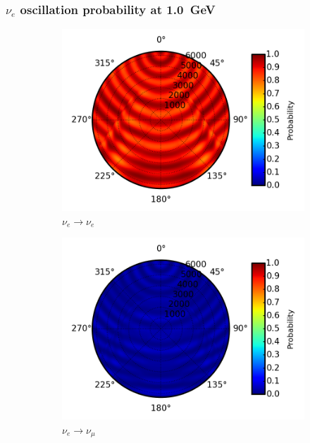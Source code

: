 \documentclass{beamer}
\begin{document}
\begin{frame}
	\frametitle{$\nu_{e}$ oscillation probability at \SI{1.0}{GeV}}
	\begin{figure}
		\centering
		\begin{subfigure}[b]{0.33\linewidth}
			\caption{ $\nu_{e} \rightarrow \nu_{e}$ }
			\includegraphics[width=\linewidth]{earth_1.0gev_nue2nue_throughEarth.png}
		\end{subfigure}
		\begin{subfigure}[b]{0.33\linewidth}
			\caption{ $\nu_{e} \rightarrow \nu_{\mu}$ }
			\includegraphics[width=\linewidth]{earth_1.0gev_nue2numu_throughEarth.png}
		\end{subfigure}
		\begin{subfigure}[b]{0.33\linewidth}

\end{subfigure}
\end{figure}
\end{frame}
\end{document}
